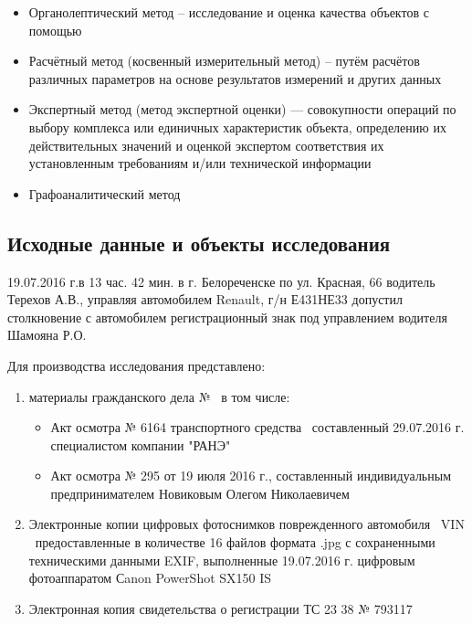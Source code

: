 \begin{itemize}
\item  Органолептический метод – исследование и оценка качества объектов с помощью %
\item Расчётный метод (косвенный измерительный метод) – путём расчётов различных параметров на основе результатов измерений и других данных
\item Экспертный метод (метод экспертной оценки) — совокупности операций по выбору комплекса или единичных характеристик объекта, определению их действительных значений и оценкой экспертом соответствия их установленным требованиям и/или технической информации
\item Графоаналитический метод
\end{itemize}

\subsection{Исходные данные и объекты исследования}

19.07.2016 г.в 13 час.  42 мин. в г. Белореченске по ул. Красная, 66 водитель Терехов А.В., управляя автомобилем Renault, г/н Е431НЕ33 допустил столкновение с автомобилем  регистрационный знак  под управлением водителя Шамояна Р.О.  
\par Для производства исследования представлено:
\begin{enumerate}
\item материалы гражданского дела № \delonum \, в том числе:
\begin{itemize}
	\item Акт осмотра № 6164 транспортного средства \, составленный 29.07.2016 г.  специалистом  компании "РАНЭ" 
	\item Акт осмотра № 295 от 19 июля 2016 г., составленный индивидуальным предпринимателем Новиковым Олегом Николаевичем
	\end{itemize}
\item Электронные копии цифровых фотоснимков поврежденного автомобиля \, VIN \vin\, предоставленные в  количестве 16 файлов формата .jpg с сохраненными техническими данными EXIF, выполненные 19.07.2016 г. цифровым фотоаппаратом Сanon PowerShot SX150 IS 
\item Электронная копия свидетельства о регистрации ТС 23 38 № 793117
\end{enumerate}


